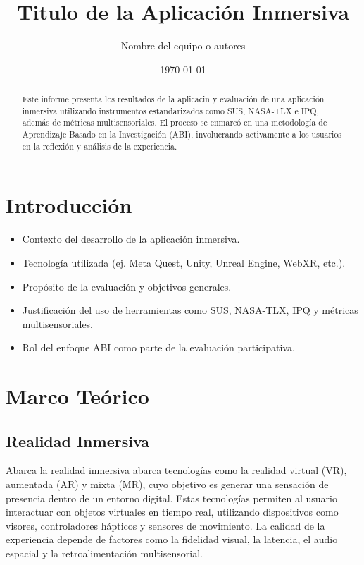\documentclass[12pt]{article}
\title{Titulo de la Aplicación Inmersiva }
\author{Nombre del equipo o autores}
\date{\today}
\begin{document}
\maketitle

\begin{abstract}
Este informe presenta los resultados de la aplicacin y evaluación de una aplicación inmersiva utilizando instrumentos estandarizados como SUS, NASA-TLX e IPQ, además de métricas multisensoriales. El proceso se enmarcó en una metodología de Aprendizaje Basado en la Investigación (ABI), involucrando activamente a los usuarios en la reflexión y análisis de la experiencia.
\end{abstract}

\tableofcontents
\newpage

\section{Introducción}
\begin{itemize}
    \item Contexto del desarrollo de la aplicación inmersiva.
    \item Tecnología utilizada (ej. Meta Quest, Unity, Unreal Engine, WebXR, etc.).
    \item Propósito de la evaluación y objetivos generales.
    \item Justificación del uso de herramientas como SUS, NASA-TLX, IPQ y métricas multisensoriales.
    \item Rol del enfoque ABI como parte de la evaluación participativa.
\end{itemize}

\section{Marco Teórico}

\subsection{Realidad Inmersiva}
Abarca la realidad inmersiva abarca tecnologías como la realidad virtual (VR), aumentada (AR) y mixta (MR), cuyo objetivo es generar una sensación de presencia dentro de un entorno digital. Estas tecnologías permiten al usuario interactuar con objetos virtuales en tiempo real, utilizando dispositivos como visores, controladores hápticos y sensores de movimiento. La calidad de la experiencia depende de factores como la fidelidad visual, la latencia, el audio espacial y la retroalimentación multisensorial.
\end{document}

